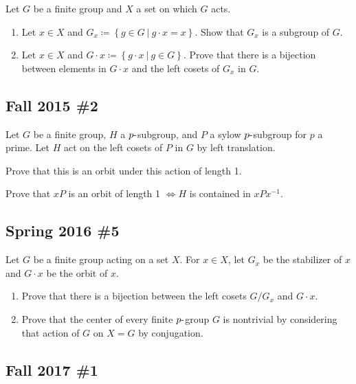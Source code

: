 Let \(G\) be a finite group and \(X\) a set on which \(G\) acts.

\begin{enumerate}
\def\labelenumi{\alph{enumi}.}
\item
  Let \(x\in X\) and
  \(G_x \coloneqq\left\{{g\in G {~\mathrel{\Big\vert}~}g\cdot x = x}\right\}\).
  Show that \(G_x\) is a subgroup of \(G\).
\item
  Let \(x\in X\) and
  \(G\cdot x \coloneqq\left\{{g\cdot x {~\mathrel{\Big\vert}~}g\in G}\right\}\).
  Prove that there is a bijection between elements in \(G\cdot x\) and
  the left cosets of \(G_x\) in \(G\).
\end{enumerate}

\hypertarget{fall-2015-2}{%
\subsection{Fall 2015 \#2}\label{fall-2015-2}}

Let \(G\) be a finite group, \(H\) a \(p{\hbox{-}}\)subgroup, and \(P\)
a sylow \(p{\hbox{-}}\)subgroup for \(p\) a prime. Let \(H\) act on the
left cosets of \(P\) in \(G\) by left translation.

Prove that this is an orbit under this action of length 1.

Prove that \(xP\) is an orbit of length 1 \(\iff H\) is contained in
\(xPx^{-1}\).

\hypertarget{spring-2016-5}{%
\subsection{Spring 2016 \#5}\label{spring-2016-5}}

Let \(G\) be a finite group acting on a set \(X\). For \(x\in X\), let
\(G_x\) be the stabilizer of \(x\) and \(G\cdot x\) be the orbit of
\(x\).

\begin{enumerate}
\def\labelenumi{\alph{enumi}.}
\item
  Prove that there is a bijection between the left cosets \(G/G_x\) and
  \(G\cdot x\).
\item
  Prove that the center of every finite \(p{\hbox{-}}\)group \(G\) is
  nontrivial by considering that action of \(G\) on \(X=G\) by
  conjugation.
\end{enumerate}

\hypertarget{fall-2017-1}{%
\subsection{Fall 2017 \#1}\label{fall-2017-1}}

